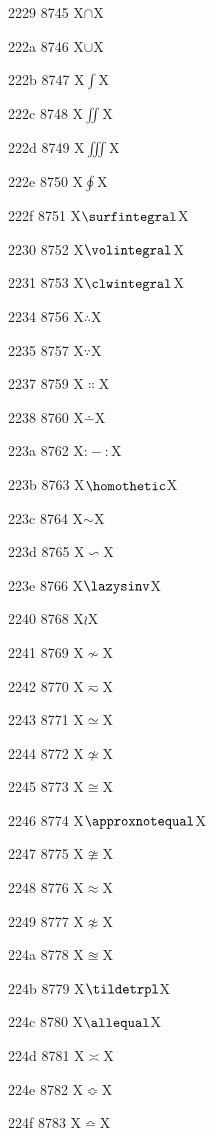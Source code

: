 \documentclass[11pt]{article}
\begin{document}
2229 8745 X{\ensuremath{\cap}}X

222a 8746 X{\ensuremath{\cup}}X

222b 8747 X{\ensuremath{\int}}X

222c 8748 X{\ensuremath{\iint}}X

222d 8749 X{\ensuremath{\iiint}}X

222e 8750 X{\ensuremath{\oint}}X

222f 8751 X{\ensuremath{\surfintegral}}X

2230 8752 X{\ensuremath{\volintegral}}X

2231 8753 X{\ensuremath{\clwintegral}}X

2234 8756 X{\ensuremath{\therefore}}X

2235 8757 X{\ensuremath{\because}}X

2237 8759 X{\ensuremath{\Colon}}X

2238 8760 X{\ensuremath{\dotminus}}X

223a 8762 X{\ensuremath{\mathbin{:}\!\!{-}\!\!{:}}}X

223b 8763 X{\ensuremath{\homothetic}}X

223c 8764 X{\ensuremath{\sim}}X

223d 8765 X{\ensuremath{\backsim}}X

223e 8766 X{\ensuremath{\lazysinv}}X

2240 8768 X{\ensuremath{\wr}}X

2241 8769 X{\ensuremath{\nsim}}X

2242 8770 X{\ensuremath{\eqsim}}X

2243 8771 X{\ensuremath{\simeq}}X

2244 8772 X{\ensuremath{\nsime}}X

2245 8773 X{\ensuremath{\cong}}X

2246 8774 X{\ensuremath{\approxnotequal}}X

2247 8775 X{\ensuremath{\ncong}}X

2248 8776 X{\ensuremath{\approx}}X

2249 8777 X{\ensuremath{\napprox}}X

224a 8778 X{\ensuremath{\approxeq}}X

224b 8779 X{\ensuremath{\tildetrpl}}X

224c 8780 X{\ensuremath{\allequal}}X

224d 8781 X{\ensuremath{\asymp}}X

224e 8782 X{\ensuremath{\Bumpeq}}X

224f 8783 X{\ensuremath{\bumpeq}}X
\end{document}
